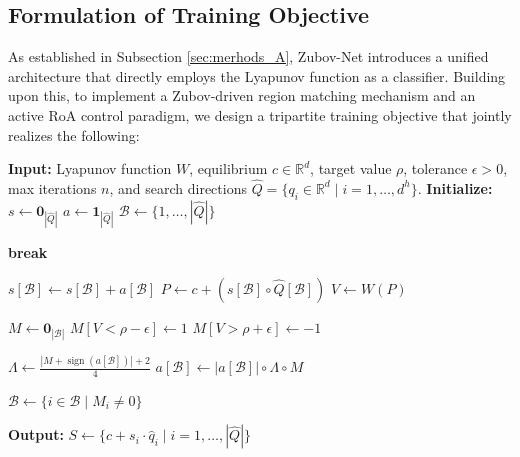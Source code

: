 \documentclass[journal]{IEEEtran}
\begin{document}
\subsection{Formulation of Training Objective}\label{sec:FTO}
As established in Subsection \ref{sec:merhods_A}, Zubov-Net introduces a unified architecture that directly employs the Lyapunov function as a classifier. Building upon this, to implement a Zubov-driven region matching mechanism and an active RoA control paradigm, we design a tripartite training objective that jointly realizes the following:
\begin{algorithm}[t]
	\caption{Parallel  Boundary Sampling}\label{alg:parallel}
	\begin{algorithmic}[1]
		\State \textbf{Input:} Lyapunov function $W$, equilibrium $c \in \mathbb{R}^d$, target value $\rho$, tolerance $\epsilon > 0$, max iterations $n$, and search directions $\hat{Q} = \{q_i \in \mathbb{R}^d \mid i=1,\dots,d^h\}$.
		\State \textbf{Initialize:}
		\Statex \quad $s \gets \mathbf{0}_{|\hat{Q}|}$ 
		\Statex \quad $a \gets \mathbf{1}_{|\hat{Q}|}$ 
		\Statex \quad $\mathcal{B} \gets \{1,\dots,|\hat{Q}|\}$ 
		
		\State \textbf{break} 
		\EndIf
		
		\State $s[\mathcal{B}] \gets s[\mathcal{B}] + a[\mathcal{B}]$ 
		\State $P \gets c +   (s[\mathcal{B}] \circ \hat{Q}[\mathcal{B}])$ 
		\State $V \gets W(P)$ 
		
		\State $M \gets \mathbf{0}_{|\mathcal{B}|}$ 
		\State $M[V < \rho - \epsilon] \gets 1$ 
		\State $M[V > \rho + \epsilon] \gets -1$ 
		
		\State $\Lambda \gets \frac{|M + \operatorname{sign}(a[\mathcal{B}])| + 2}{4}$ 
		\State $a[\mathcal{B}] \gets |a[\mathcal{B}]| \circ \Lambda \circ M$ 
		
		\State $\mathcal{B} \gets \{ i \in \mathcal{B} \mid M_i \neq 0 \}$ 
		\EndFor
		
		\State \textbf{Output:} $S \gets \{ c +   s_i \cdot \hat{q}_i \mid i=1,\dots,|\hat{Q}|\}$
	\end{algorithmic}
\end{algorithm}
\end{document}
